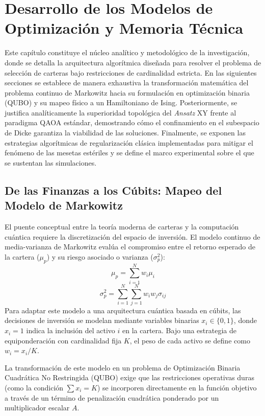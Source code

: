 \chapter{Desarrollo de los Modelos de Optimización y Memoria Técnica}
\label{ch:desarrollo_modelos_memoria_tecnica}

Este capítulo constituye el núcleo analítico y metodológico de la investigación, donde se detalla la arquitectura algorítmica diseñada para resolver el problema de selección de carteras bajo restricciones de cardinalidad estricta. En las siguientes secciones se establece de manera exhaustiva la transformación matemática del problema continuo de Markowitz hacia su formulación en optimización binaria (QUBO) y su mapeo físico a un Hamiltoniano de Ising. Posteriormente, se justifica analíticamente la superioridad topológica del \textit{Ansatz} XY frente al paradigma QAOA estándar, demostrando cómo el confinamiento en el subespacio de Dicke garantiza la viabilidad de las soluciones. Finalmente, se exponen las estrategias algorítmicas de regularización clásica implementadas para mitigar el fenómeno de las mesetas estériles y se define el marco experimental sobre el que se sustentan las simulaciones.

\section{De las Finanzas a los Cúbits: Mapeo del Modelo de Markowitz}
\label{sec:mapeo_markowitz}

El puente conceptual entre la teoría moderna de carteras y la computación cuántica requiere la discretización del espacio de inversión. El modelo continuo de media-varianza de Markowitz evalúa el compromiso entre el retorno esperado de la cartera ($\mu_p$) y su riesgo asociado o varianza ($\sigma_p^2$):
\begin{equation}
    \mu_p = \sum_{i=1}^{N} w_i \mu_i
\end{equation}
\begin{equation}
    \sigma_p^2 = \sum_{i=1}^{N} \sum_{j=1}^{N} w_i w_j \sigma_{ij}
\end{equation}
Para adaptar este modelo a una arquitectura cuántica basada en cúbits, las decisiones de inversión se modelan mediante variables binarias $x_i \in \{0,1\}$, donde $x_i = 1$ indica la inclusión del activo $i$ en la cartera. Bajo una estrategia de equiponderación con cardinalidad fija $K$, el peso de cada activo se define como $w_i = x_i / K$.

La transformación de este modelo en un problema de Optimización Binaria Cuadrática No Restringida (QUBO) exige que las restricciones operativas duras (como la condición $\sum x_i = K$) se incorporen directamente en la función objetivo a través de un término de penalización cuadrática ponderado por un multiplicador escalar $A$. 


